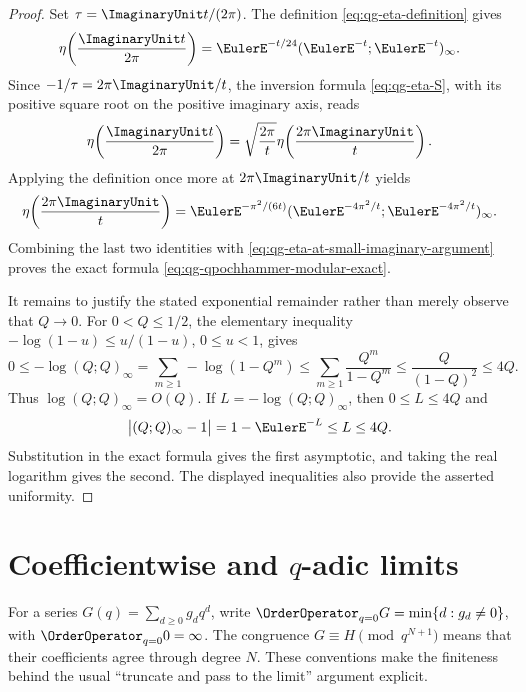 \begin{proof}
Set \(\tau=\ImaginaryUnit t/(2\pi)\).  The definition
\eqref{eq:qg-eta-definition} gives
\begin{equation}
 \eta\!\left(\frac{\ImaginaryUnit t}{2\pi}\right)
 =\EulerE^{-t/24}(\EulerE^{-t};\EulerE^{-t})_\infty.
\label{eq:qg-eta-at-small-imaginary-argument}
\end{equation}
Since \(-1/\tau=2\pi\ImaginaryUnit/t\), the inversion formula
\eqref{eq:qg-eta-S}, with its positive square root on the positive imaginary
axis, reads
\[
 \eta\!\left(\frac{\ImaginaryUnit t}{2\pi}\right)
 =\sqrt{\frac{2\pi}{t}}
   \eta\!\left(\frac{2\pi\ImaginaryUnit}{t}\right).
\]
Applying the definition once more at \(2\pi\ImaginaryUnit/t\) yields
\[
 \eta\!\left(\frac{2\pi\ImaginaryUnit}{t}\right)
 =\EulerE^{-\pi^2/(6t)}
   (\EulerE^{-4\pi^2/t};\EulerE^{-4\pi^2/t})_\infty.
\]
Combining the last two identities with
\eqref{eq:qg-eta-at-small-imaginary-argument} proves the exact formula
\eqref{eq:qg-qpochhammer-modular-exact}.

It remains to justify the stated exponential remainder rather than merely
observe that \(Q\to0\).  For \(0<Q\le1/2\), the elementary inequality
\(-\log(1-u)\le u/(1-u)\), \(0\le u<1\), gives
\[
 0\le-\log(Q;Q)_\infty
 =\sum_{m\ge1}-\log(1-Q^m)
 \le\sum_{m\ge1}\frac{Q^m}{1-Q^m}
 \le\frac{Q}{(1-Q)^2}
 \le4Q.
\]
Thus \(\log(Q;Q)_\infty=O(Q)\).  If
\(L=-\log(Q;Q)_\infty\), then \(0\le L\le4Q\) and
\[
 \bigl|(Q;Q)_\infty-1\bigr|=1-\EulerE^{-L}\le L\le4Q.
\]
Substitution in the exact formula gives the first asymptotic, and taking the
real logarithm gives the second.  The displayed inequalities also provide
the asserted uniformity.
\end{proof}

\section{\texorpdfstring{Coefficientwise and \(q\)-adic limits}{Coefficientwise and q-adic limits}}

For a series \(G(q)=\sum_{d\ge0}g_dq^d\), write
\(\OrderOperator_{q=0} G=\min\{d:g_d\ne0\}\), with
\(\OrderOperator_{q=0} 0=\infty\).  The congruence
\(G\equiv H\pmod{q^{N+1}}\) means that their coefficients agree through
degree \(N\).  These conventions make the finiteness behind the usual
“truncate and pass to the limit” argument explicit.

